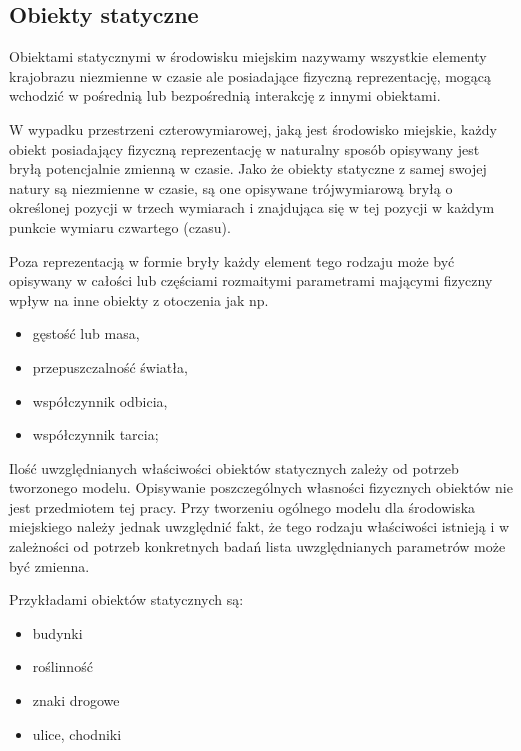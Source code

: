 \subsection{Obiekty statyczne}
\par{
Obiektami statycznymi w środowisku miejskim nazywamy wszystkie elementy krajobrazu niezmienne w czasie ale posiadające fizyczną reprezentację, mogącą wchodzić w pośrednią lub bezpośrednią interakcję z innymi obiektami.
}
\par{
W wypadku przestrzeni czterowymiarowej, jaką jest środowisko miejskie, każdy obiekt posiadający fizyczną reprezentację w naturalny sposób opisywany jest bryłą potencjalnie zmienną w czasie. Jako że obiekty statyczne z samej swojej natury są niezmienne w czasie, są one opisywane trójwymiarową bryłą o określonej pozycji w trzech wymiarach i znajdująca się w tej pozycji w każdym punkcie wymiaru czwartego (czasu).
}
\par{
Poza reprezentacją w formie bryły każdy element tego rodzaju może być opisywany w całości lub częściami rozmaitymi parametrami mającymi fizyczny wpływ na inne obiekty z otoczenia jak np.
\begin{itemize}
\item gęstość lub masa,
\item przepuszczalność światła,
\item współczynnik odbicia,
\item współczynnik tarcia;
\end{itemize}
}
\par{
Ilość uwzględnianych właściwości obiektów statycznych zależy od potrzeb tworzonego modelu. Opisywanie poszczególnych własności fizycznych obiektów nie jest przedmiotem tej pracy. Przy tworzeniu ogólnego modelu dla środowiska miejskiego należy jednak uwzględnić fakt, że tego rodzaju właściwości istnieją i w zależności od potrzeb konkretnych badań lista uwzględnianych parametrów może być zmienna.
}
\par{
Przykładami obiektów statycznych są:
\begin{itemize}
\item budynki
\item roślinność
\item znaki drogowe
\item ulice, chodniki
\end{itemize}
}
